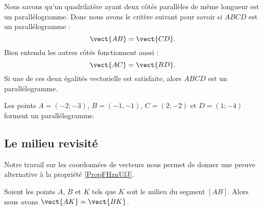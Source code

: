 Nous savons qu'un quadrilatère ayant deux côtés parallèles de même longueur est un parallélogramme. Donc nous avons le critère suivant pour savoir si \( ABCD\) est un parallélogramme :
\begin{equation}
    \vect{ AB }=\vect{ CD }.
\end{equation}
Bien entendu les autres côtés fonctionnent aussi :
\begin{equation}
    \vect{ AC }=\vect{ BD }.
\end{equation}
Si une de ces deux égalités vectorielle est satisfaite, alors \( ABCD\) est un parallélogramme.

\begin{example}
    Les points \( A=(-2;-3)\), \( B=(-1,-1)\), \( C=(2;-2)\) et \( D=(1;-4)\) forment un parallélogramme.
\end{example}

\subsection{Le milieu revisité}

Notre travail sur les coordonnées de vecteurs nous permet de donner une preuve alternative à la propriété \ref{PropFHznUfJ}.

\begin{propriete}
    Soient les points \( A\), \( B\) et \( K\) tels que \( K\) soit le milieu du segment \( [AB]\). Alors nous avons \( \vect{ AK }=\vect{ BK }\).
\end{propriete}

